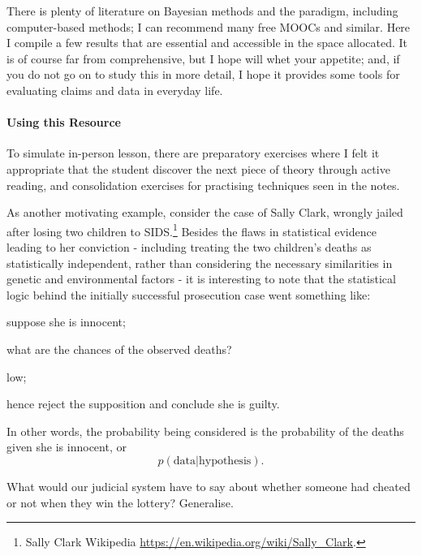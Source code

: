 \documentclass{article}
\begin{document}
There is plenty of literature on Bayesian methods and the paradigm, including computer-based methods; I can recommend many free MOOCs and similar. Here I compile a few results that are essential and accessible in the space allocated. It is of course far from comprehensive, but I hope will whet your appetite; and, if you do not go on to study this in more detail, I hope it provides some tools for evaluating claims and data in everyday life.

\paragraph{Using this Resource}
To simulate in-person lesson, there are preparatory exercises where I felt it appropriate that the student discover the next piece of theory through active reading, and consolidation exercises for practising techniques seen in the notes.


As another motivating example, consider the case of Sally Clark, wrongly jailed after losing two children to SIDS.\footnote{Sally Clark Wikipedia \url{https://en.wikipedia.org/wiki/Sally_Clark}.} Besides the flaws in statistical evidence leading to her conviction - including treating the two children's deaths as statistically independent, rather than considering the necessary similarities in genetic and environmental factors - it is interesting to note that the statistical logic behind the initially successful prosecution case went something like:
\begin{enumerate}[leftmargin=2cm,labelsep=0cm,align=left,label={[\arabic*]}]
   \item suppose she is innocent;
   \item what are the chances of the observed deaths?
   \item low;
   \item hence reject the supposition and conclude she is guilty.
\end{enumerate}
In other words, the probability being considered is the probability of the deaths given she is innocent, or
\begin{equation}
{p(\text{data}|\text{hypothesis})}.    
\end{equation}

\begin{Exercise}
    What would our judicial system have to say about whether someone had cheated or not when they win the lottery? Generalise.
\end{Exercise}
\vspace{5mm}
\end{document}
